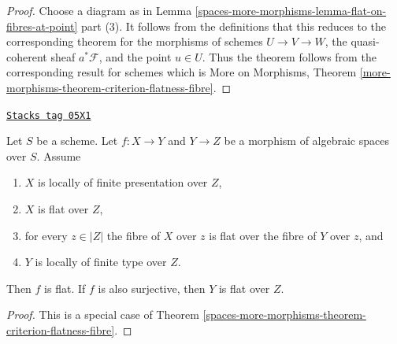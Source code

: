 \begin{proof}
Choose a diagram as in
Lemma \ref{spaces-more-morphisms-lemma-flat-on-fibres-at-point} part (3).
It follows from the definitions that this reduces to the
corresponding theorem for the morphisms of schemes
$U \to V \to W$, the quasi-coherent sheaf $a^*\mathcal{F}$,
and the point $u \in U$. Thus the theorem follows from the
corresponding result for schemes which is
More on Morphisms,
Theorem \ref{more-morphisms-theorem-criterion-flatness-fibre}.
\end{proof}

\begin{lemma}
\label{spaces-more-morphisms-lemma-morphism-between-flat}
\href{https://stacks.math.columbia.edu/tag/05X1}{\texttt{Stacks tag 05X1}}

Let $S$ be a scheme.
Let $f : X \to Y$ and $Y \to Z$ be a morphism of algebraic spaces over $S$.
Assume
\begin{enumerate}
\item $X$ is locally of finite presentation over $Z$,
\item $X$ is flat over $Z$,
\item for every $z \in |Z|$ the fibre of $X$ over $z$
is flat over the fibre of $Y$ over $z$, and
\item $Y$ is locally of finite type over $Z$.
\end{enumerate}
Then $f$ is flat. If $f$ is also surjective, then $Y$ is flat over $Z$.
\end{lemma}

\begin{proof}
This is a special case of
Theorem \ref{spaces-more-morphisms-theorem-criterion-flatness-fibre}.
\end{proof}

